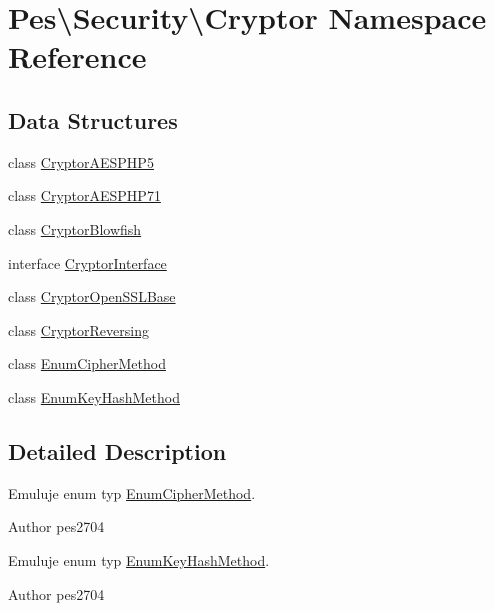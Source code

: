\hypertarget{namespace_pes_1_1_security_1_1_cryptor}{}\section{Pes\textbackslash{}Security\textbackslash{}Cryptor Namespace Reference}
\label{namespace_pes_1_1_security_1_1_cryptor}
\subsection*{Data Structures}
\begin{DoxyCompactItemize}
\item 
class \mbox{\hyperlink{class_pes_1_1_security_1_1_cryptor_1_1_cryptor_a_e_s_p_h_p5}{Cryptor\+A\+E\+S\+P\+H\+P5}}
\item 
class \mbox{\hyperlink{class_pes_1_1_security_1_1_cryptor_1_1_cryptor_a_e_s_p_h_p71}{Cryptor\+A\+E\+S\+P\+H\+P71}}
\item 
class \mbox{\hyperlink{class_pes_1_1_security_1_1_cryptor_1_1_cryptor_blowfish}{Cryptor\+Blowfish}}
\item 
interface \mbox{\hyperlink{interface_pes_1_1_security_1_1_cryptor_1_1_cryptor_interface}{Cryptor\+Interface}}
\item 
class \mbox{\hyperlink{class_pes_1_1_security_1_1_cryptor_1_1_cryptor_open_s_s_l_base}{Cryptor\+Open\+S\+S\+L\+Base}}
\item 
class \mbox{\hyperlink{class_pes_1_1_security_1_1_cryptor_1_1_cryptor_reversing}{Cryptor\+Reversing}}
\item 
class \mbox{\hyperlink{class_pes_1_1_security_1_1_cryptor_1_1_enum_cipher_method}{Enum\+Cipher\+Method}}
\item 
class \mbox{\hyperlink{class_pes_1_1_security_1_1_cryptor_1_1_enum_key_hash_method}{Enum\+Key\+Hash\+Method}}
\end{DoxyCompactItemize}


\subsection{Detailed Description}
Emuluje enum typ \mbox{\hyperlink{class_pes_1_1_security_1_1_cryptor_1_1_enum_cipher_method}{Enum\+Cipher\+Method}}.

\begin{DoxyAuthor}{Author}
pes2704
\end{DoxyAuthor}
Emuluje enum typ \mbox{\hyperlink{class_pes_1_1_security_1_1_cryptor_1_1_enum_key_hash_method}{Enum\+Key\+Hash\+Method}}.

\begin{DoxyAuthor}{Author}
pes2704 
\end{DoxyAuthor}
